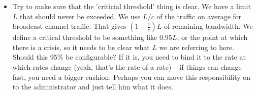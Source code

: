 \begin{itemize}
\item 
  Try to make sure that the 'criticial threshold' thing is clear. We have a limit $L$ that should never be exceeded. 
  We use $L/c$ of the traffic on average for broadcast channel traffic. That gives $(1-\frac{1}{c})L$ of remaining 
  bandwidth. We define a critical threshold to be something like $0.95 L$, or the point at which there is a crisis,
  so it needs to be clear what $L$ we are referring to here. Should this 95\% be configurable? If it is, you need to
  bind it to the rate at which rates change (yeah, that's the rate of a rate) -- if things can change fast, you need
  a bigger cushion. Perhaps you can move this responsibility on to the administrator and just tell him what it does.

\end{itemize}